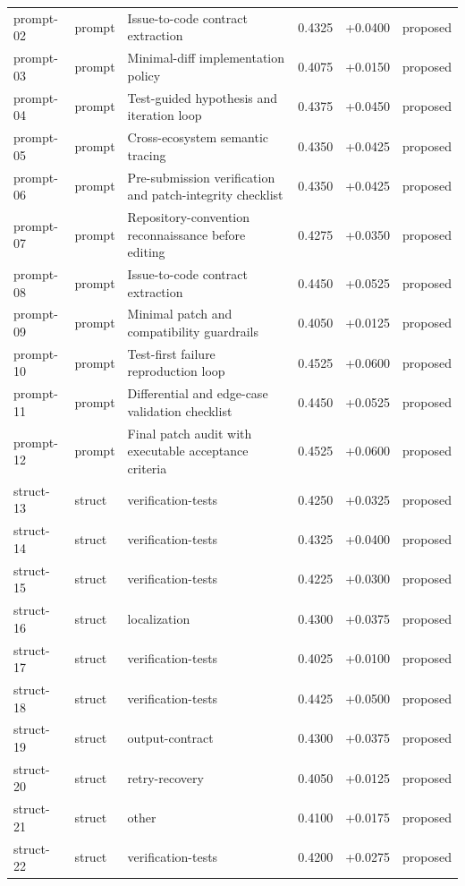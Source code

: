 \begin{center}
\begin{longtable}{llp{5.2cm}rrl}
prompt-02 & prompt & Issue-to-code contract extraction & 0.4325 & +0.0400 & proposed \\
prompt-03 & prompt & Minimal-diff implementation policy & 0.4075 & +0.0150 & proposed \\
prompt-04 & prompt & Test-guided hypothesis and iteration loop & 0.4375 & +0.0450 & proposed \\
prompt-05 & prompt & Cross-ecosystem semantic tracing & 0.4350 & +0.0425 & proposed \\
prompt-06 & prompt & Pre-submission verification and patch-integrity checklist & 0.4350 & +0.0425 & proposed \\
prompt-07 & prompt & Repository-convention reconnaissance before editing & 0.4275 & +0.0350 & proposed \\
prompt-08 & prompt & Issue-to-code contract extraction & 0.4450 & +0.0525 & proposed \\
prompt-09 & prompt & Minimal patch and compatibility guardrails & 0.4050 & +0.0125 & proposed \\
prompt-10 & prompt & Test-first failure reproduction loop & 0.4525 & +0.0600 & proposed \\
prompt-11 & prompt & Differential and edge-case validation checklist & 0.4450 & +0.0525 & proposed \\
prompt-12 & prompt & Final patch audit with executable acceptance criteria & 0.4525 & +0.0600 & proposed \\
struct-13 & struct & verification-tests & 0.4250 & +0.0325 & proposed \\
struct-14 & struct & verification-tests & 0.4325 & +0.0400 & proposed \\
struct-15 & struct & verification-tests & 0.4225 & +0.0300 & proposed \\
struct-16 & struct & localization & 0.4300 & +0.0375 & proposed \\
struct-17 & struct & verification-tests & 0.4025 & +0.0100 & proposed \\
struct-18 & struct & verification-tests & 0.4425 & +0.0500 & proposed \\
struct-19 & struct & output-contract & 0.4300 & +0.0375 & proposed \\
struct-20 & struct & retry-recovery & 0.4050 & +0.0125 & proposed \\
struct-21 & struct & other & 0.4100 & +0.0175 & proposed \\
struct-22 & struct & verification-tests & 0.4200 & +0.0275 & proposed \\

\end{longtable}
\end{center}
